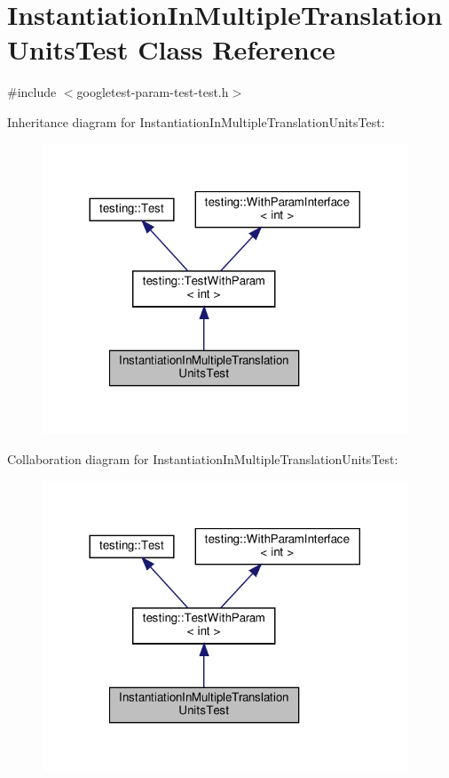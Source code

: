 \hypertarget{classInstantiationInMultipleTranslationUnitsTest}{}\section{Instantiation\+In\+Multiple\+Translation\+Units\+Test Class Reference}
\label{classInstantiationInMultipleTranslationUnitsTest}


{\ttfamily \#include $<$googletest-\/param-\/test-\/test.\+h$>$}



Inheritance diagram for Instantiation\+In\+Multiple\+Translation\+Units\+Test\+:\nopagebreak
\begin{figure}[H]
\begin{center}
\leavevmode
\includegraphics[width=308pt]{classInstantiationInMultipleTranslationUnitsTest__inherit__graph}
\end{center}
\end{figure}


Collaboration diagram for Instantiation\+In\+Multiple\+Translation\+Units\+Test\+:\nopagebreak
\begin{figure}[H]
\begin{center}
\leavevmode
\includegraphics[width=308pt]{classInstantiationInMultipleTranslationUnitsTest__coll__graph}
\end{center}
\end{figure}
